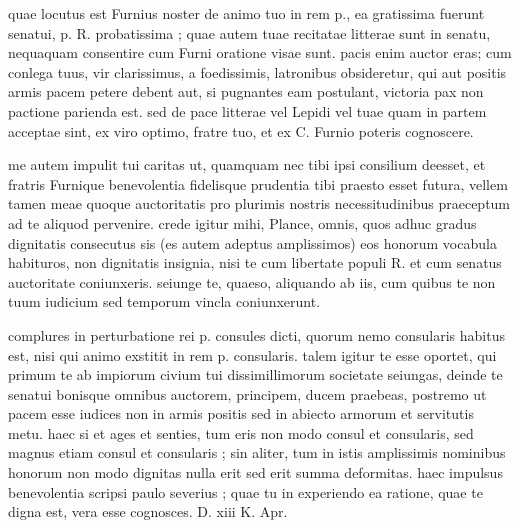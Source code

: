


 quae locutus est Furnius noster de animo tuo in rem p., ea gratissima fuerunt senatui, p. R. probatissima ; quae autem tuae recitatae litterae sunt in senatu, nequaquam consentire cum Furni oratione visae sunt. pacis enim auctor eras; cum conlega tuus, vir clarissimus, a foedissimis, latronibus obsideretur, qui aut positis armis pacem petere debent aut, si pugnantes eam postulant, victoria pax non pactione parienda est. sed de pace litterae vel Lepidi vel tuae quam in partem acceptae sint, ex viro optimo, fratre tuo, et ex C. Furnio poteris cognoscere.

 me autem impulit tui caritas ut, quamquam nec tibi ipsi consilium deesset, et fratris Furnique benevolentia fidelisque prudentia tibi praesto esset futura, vellem tamen meae quoque auctoritatis pro plurimis nostris necessitudinibus praeceptum ad te aliquod pervenire. crede igitur mihi, Plance, omnis, quos adhuc gradus dignitatis consecutus sis (es autem adeptus amplissimos) eos honorum vocabula habituros, non dignitatis insignia, nisi te cum libertate populi R. et cum senatus auctoritate coniunxeris. seiunge te, quaeso, aliquando ab iis, cum quibus te non tuum iudicium sed temporum vincla coniunxerunt.

 complures in perturbatione rei p. consules dicti, quorum nemo consularis habitus est, nisi qui animo exstitit in rem p. consularis. talem igitur te esse oportet, qui primum te ab impiorum civium tui dissimillimorum societate seiungas, deinde te senatui bonisque omnibus auctorem, principem, ducem praebeas, postremo ut pacem esse iudices non in armis positis sed in abiecto armorum et servitutis metu. haec si et ages et senties, tum eris non modo consul et consularis, sed magnus etiam consul et consularis ; sin aliter, tum in istis amplissimis nominibus honorum non modo dignitas nulla erit sed erit summa deformitas. haec impulsus benevolentia scripsi paulo severius ; quae tu in experiendo ea ratione, quae te digna est, vera esse cognosces. D. xiii K. Apr.
